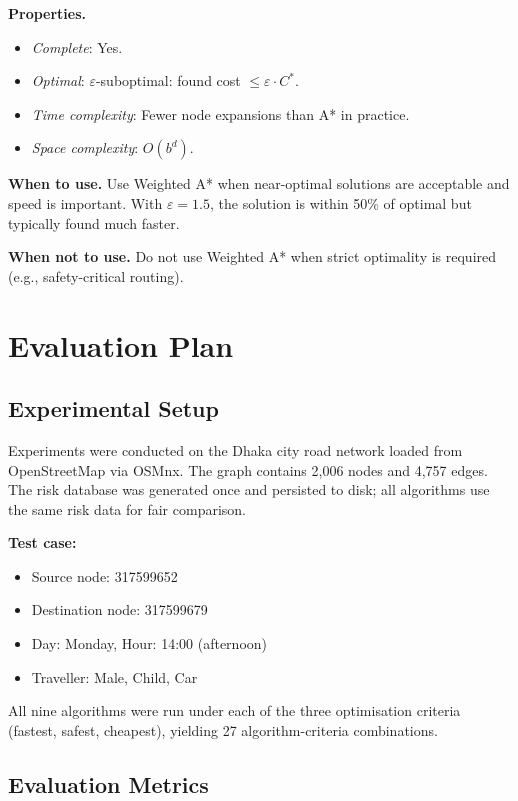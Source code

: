 ﻿\documentclass[a4paper, 12pt]{article}
\theoremstyle{remark}
\begin{document}
\textbf{Properties.}
\begin{itemize}
    \item \emph{Complete}: Yes.
    \item \emph{Optimal}: $\varepsilon$-suboptimal: found cost $\leq \varepsilon \cdot C^*$.
    \item \emph{Time complexity}: Fewer node expansions than A* in practice.
    \item \emph{Space complexity}: $O(b^d)$.
\end{itemize}

\textbf{When to use.} Use Weighted A* when near-optimal solutions are acceptable and speed is important. With $\varepsilon = 1.5$, the solution is within 50\% of optimal but typically found much faster.

\textbf{When not to use.} Do not use Weighted A* when strict optimality is required (e.g., safety-critical routing).

\section{Evaluation Plan}

\subsection{Experimental Setup}

Experiments were conducted on the Dhaka city road network loaded from OpenStreetMap via OSMnx. The graph contains 2,006 nodes and 4,757 edges. The risk database was generated once and persisted to disk; all algorithms use the same risk data for fair comparison.

\textbf{Test case:}
\begin{itemize}
    \item Source node: 317599652
    \item Destination node: 317599679
    \item Day: Monday, Hour: 14:00 (afternoon)
    \item Traveller: Male, Child, Car
\end{itemize}

All nine algorithms were run under each of the three optimisation criteria (fastest, safest, cheapest), yielding 27 algorithm-criteria combinations.

\subsection{Evaluation Metrics}
\end{document}
